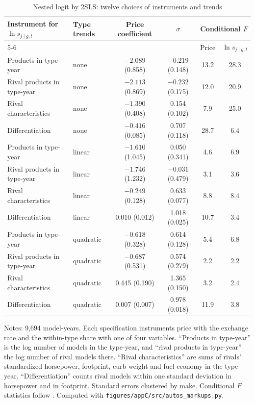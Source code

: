 \begin{table}[htbp]
\centering
\caption{Nested logit by 2SLS: twelve choices of instruments and trends}
\label{tab:C-autos-nl}
\footnotesize
\begin{tabular}{@{}llcccc@{}}
\toprule
Instrument for $\ln s_{j\mid g,t}$ & Type trends & Price coefficient & $\sigma$ & \multicolumn{2}{c}{Conditional $F$} \\
\cmidrule(lr){5-6}
 & & & & Price & $\ln s_{j\mid g,t}$ \\
\midrule
Products in type-year & none & $-2.089$ (0.858) & $-0.219$ (0.148) & 13.2 & 28.3 \\
Rival products in type-year & none & $-2.113$ (0.869) & $-0.232$ (0.175) & 12.0 & 20.9 \\
Rival characteristics & none & $-1.390$ (0.408) & 0.154 (0.102) & 7.9 & 25.0 \\
Differentiation & none & $-0.416$ (0.085) & 0.707 (0.118) & 28.7 & 6.4 \\
\addlinespace
Products in type-year & linear & $-1.610$ (1.045) & 0.050 (0.341) & 4.6 & 6.9 \\
Rival products in type-year & linear & $-1.746$ (1.232) & $-0.031$ (0.479) & 3.1 & 3.6 \\
Rival characteristics & linear & $-0.249$ (0.128) & 0.633 (0.077) & 8.8 & 8.4 \\
Differentiation & linear & 0.010 (0.012) & 1.018 (0.025) & 10.7 & 3.4 \\
\addlinespace
Products in type-year & quadratic & $-0.618$ (0.328) & 0.614 (0.128) & 5.4 & 6.8 \\
Rival products in type-year & quadratic & $-0.687$ (0.531) & 0.574 (0.279) & 2.2 & 2.2 \\
Rival characteristics & quadratic & 0.445 (0.190) & 1.365 (0.150) & 3.2 & 2.4 \\
Differentiation & quadratic & 0.007 (0.007) & 0.978 (0.018) & 11.9 & 3.8 \\
\bottomrule
\end{tabular}

\vspace{3pt}
\begin{minipage}{0.97\textwidth}
\footnotesize Notes: 9,694 model-years. Each specification instruments price with the exchange rate and the
within-type share with one of four variables. ``Products in type-year'' is the log number of models in the type-year,
and ``rival products in type-year'' the log number of rival models there. ``Rival characteristics'' are sums of rivals'
standardized horsepower, footprint, curb weight and fuel economy in the type-year. ``Differentiation'' counts rival
models within one standard deviation in horsepower and in footprint. Standard errors clustered by make.
Conditional $F$ statistics follow \citet{SandersonWindmeijer2016}. Computed with
\texttt{figures/appC/src/autos\_markups.py}.
\end{minipage}
\end{table}

